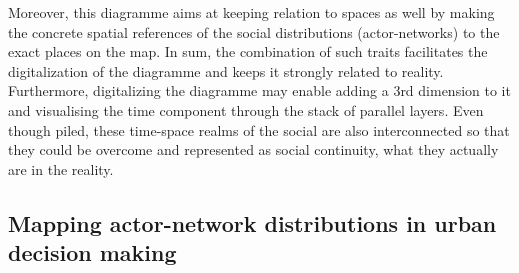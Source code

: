 \documentclass[11pt]{report}
\begin{document}
Moreover, this diagramme aims at keeping relation to spaces as well by making the concrete spatial references of the social distributions (actor-networks) to the exact places on the map.
In sum, the combination of such traits facilitates the digitalization of the diagramme and keeps it strongly related to reality.
Furthermore, digitalizing the diagramme  may enable adding a 3rd dimension to it and visualising the time component through the stack of parallel layers. Even though piled, these time-space realms of the social are also interconnected so that they could be overcome and represented as social continuity, what they actually are in the reality. 
  
\subsection{Mapping actor-network distributions in urban decision making}
\end{document}
